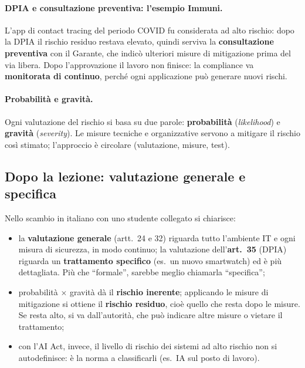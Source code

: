 \paragraph{DPIA e consultazione preventiva: l'esempio Immuni.} L'app di contact tracing del periodo
COVID fu considerata ad alto rischio: dopo la DPIA il rischio residuo restava elevato, quindi serviva la
\textbf{consultazione preventiva} con il Garante, che indicò ulteriori misure di mitigazione prima del
via libera. Dopo l'approvazione il lavoro non finisce: la compliance va \textbf{monitorata di continuo},
perché ogni applicazione può generare nuovi rischi.

\paragraph{Probabilità e gravità.} Ogni valutazione del rischio si basa su due parole:
\textbf{probabilità} (\emph{likelihood}) e \textbf{gravità} (\emph{severity}). Le misure tecniche e
organizzative servono a mitigare il rischio così stimato; l'approccio è circolare (valutazione,
misure, test).

\subsection{Dopo la lezione: valutazione generale e specifica}
Nello scambio in italiano con uno studente collegato si chiarisce:
\begin{itemize}
  \item la \textbf{valutazione generale} (artt.~24 e 32) riguarda tutto l'ambiente IT e ogni misura di
    sicurezza, in modo continuo; la valutazione dell'\textbf{art.~35} (DPIA) riguarda un
    \textbf{trattamento specifico} (es.\ un nuovo smartwatch) ed è più dettagliata. Più che
    ``formale'', sarebbe meglio chiamarla ``specifica'';
  \item probabilità $\times$ gravità dà il \textbf{rischio inerente}; applicando le misure di mitigazione
    si ottiene il \textbf{rischio residuo}, cioè quello che resta dopo le misure. Se resta alto, si va dall'autorità, che può indicare altre
    misure o vietare il trattamento;
  \item con l'AI Act, invece, il livello di rischio dei sistemi ad alto rischio non si autodefinisce: è
    la norma a classificarli (es.\ IA sul posto di lavoro).
\end{itemize}

